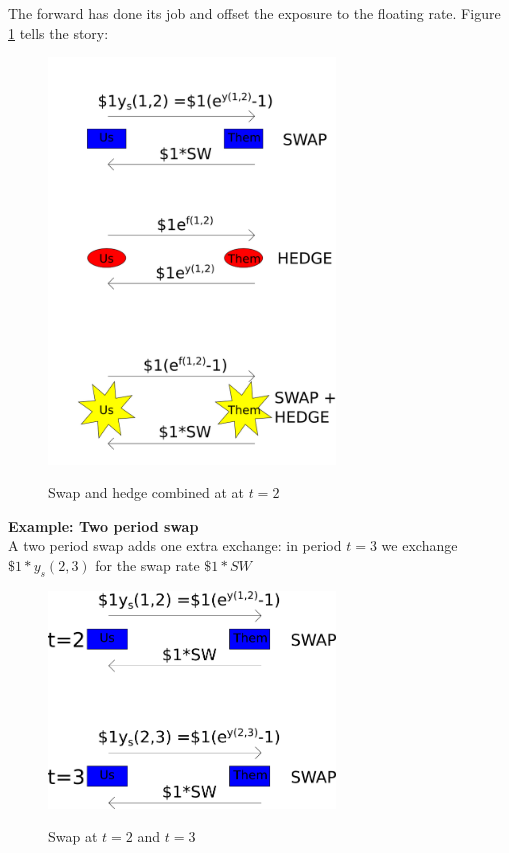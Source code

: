 \documentclass{tran-l}
\theoremstyle{definition}
\theoremstyle{remark}
\numberwithin{equation}{subsection}
\begin{document}
The forward has done its job and offset the exposure to the floating rate. Figure \ref{swapAndHedge} tells the story:

\begin{figure}[htbp]
\begin{center}
  \includegraphics[width=3in]{pics/swapAndHedge.png} \\
  \caption{Swap and hedge combined at at $t=2$}
\label{swapAndHedge}
\end{center}
\end{figure}


\textbf{Example: Two period swap}\\

A two period swap adds one extra exchange: in period $t=3$ we exchange $\$1*y_s(2,3)$ for the swap rate $\$1*SW$ 

\begin{figure}[htbp]
\begin{center}
  \includegraphics[width=3in]{pics/swap2P.png} \\
  \caption{Swap at $t=2$ and $t=3$}
\label{swap2P}
\end{center}
\end{figure}
\end{document}
